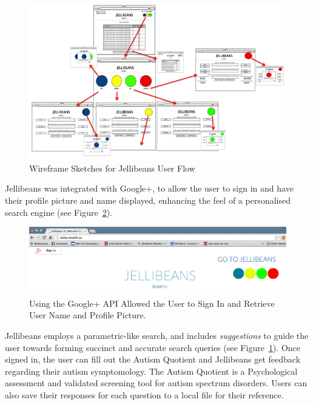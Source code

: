 \documentclass[a4paper, 11pt]{article}
\begin{document}
\begin{figure}[H]
\begin{center}
\includegraphics[scale=0.7]{JellibeanUserFlow.png}
\end{center}
\caption{Wireframe Sketches for Jellibeans User Flow}
\label{JBeanUserFlow}
\end{figure}

Jellibeans was integrated with Google+, to allow the user to sign in and have their profile picture and name displayed, enhancing the feel of a personalised search engine (see Figure~\ref{googlesignin}).

\begin{figure}[H]
\begin{center}
\includegraphics[scale=0.25]{Googleplus}
\end{center}
\caption{Using the Google+ API Allowed the User to Sign In and Retrieve User Name and Profile Picture.}
\label{googlesignin}
\end{figure}

Jellibeans employs a parametric-like search, and includes \textit{suggestions} to guide the user towards forming succinct and accurate search queries (see Figure~\ref{JBeanUserFlow}). Once signed in, the user can fill out the Autism Quotient and Jellibeans get feedback regarding their autism symptomology. The Autism Quotient \cite{Baron Cohen et al} is a Psychological assessment and validated screening tool for autism spectrum disorders. Users can also save their responses for each question to a local file for their reference.
\end{document}
